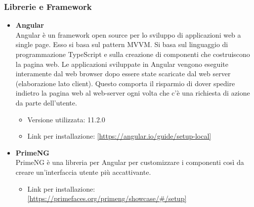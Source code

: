 \subsubsection{Librerie e Framework}

\begin{itemize}
	\item \textbf{Angular} \\
	Angular è un framework open source per lo sviluppo di applicazioni web a single page. Esso si basa sul pattern MVVM. Si basa sul linguaggio di programmazione TypeScript e sulla creazione di componenti che costruiscono la pagina web. Le applicazioni sviluppate in Angular vengono eseguite interamente dal web browser dopo essere state scaricate dal web server (elaborazione lato client). Questo comporta il risparmio di dover spedire indietro la pagina web al web-server ogni volta che c'è una richiesta di azione da parte dell'utente.
	\begin{itemize}
		\item Versione utilizzata: 11.2.0
		\item Link per installazione: \ref{https://angular.io/guide/setup-local}
	\end{itemize}
 	\item \textbf{PrimeNG} \\
 	PrimeNG è una libreria per Angular per customizzare i componenti così da creare un'interfaccia utente più accattivante.
	 \begin{itemize}
		\item Link per installazione: \ref{https://primefaces.org/primeng/showcase/#/setup}
	\end{itemize}

	
\end{itemize}